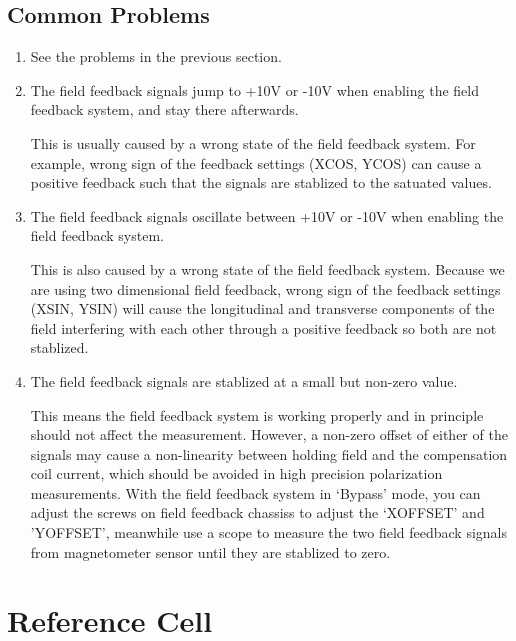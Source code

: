 \subsection{Common Problems}
\begin{enumerate}
\item See the problems in the previous section.

\item The field feedback signals jump to +10V or -10V when enabling the field feedback
system, and stay there afterwards.

This is usually caused by a wrong state of the field feedback system.  For example, wrong
sign of the feedback settings (XCOS, YCOS) can cause a positive feedback such that the 
signals are stablized to the satuated values.

\item The field feedback signals oscillate between +10V or -10V when enabling the field feedback
system.

This is also caused by a wrong state of the field feedback system.  Because we are using
two dimensional field feedback, wrong
sign of the feedback settings (XSIN, YSIN) will cause the longitudinal and transverse 
components of the field interfering with each other through a positive feedback so both
are not stablized.

\item The field feedback signals are stablized at a small but non-zero value.

This means the field feedback system is working properly and in principle should not
affect the measurement.  However, a non-zero offset of either of the signals may cause
a non-linearity between holding field and the compensation coil current, which should
be avoided in high precision polarization measurements.  With the field feedback 
system in `Bypass' mode, you can adjust the screws on 
field feedback chassiss to adjust the `XOFFSET' and 'YOFFSET',
meanwhile use a scope to measure the two field feedback signals from magnetometer sensor
until they are stablized to zero.

\end{enumerate}


\section{Reference Cell}
\label{sec:refcell}

